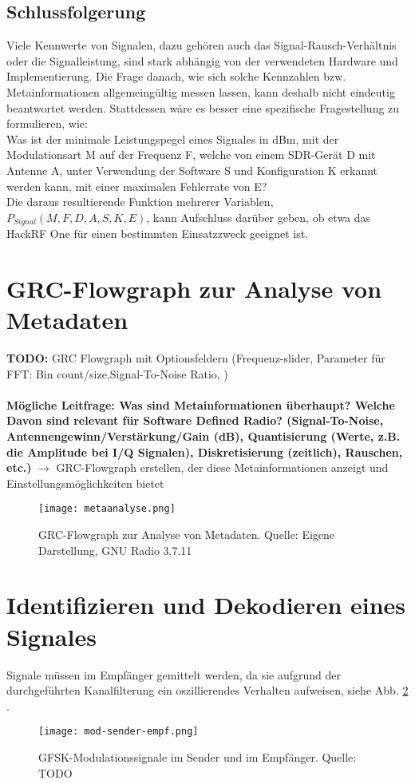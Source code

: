 \subsection{Schlussfolgerung}
Viele Kennwerte von Signalen, dazu gehören auch das Signal-Rausch-Verhältnis oder die Signalleistung, sind stark abhängig von der verwendeten Hardware und Implementierung.
Die Frage danach, wie sich solche Kennzahlen bzw. Metainformationen allgemeingültig messen lassen, kann deshalb nicht eindeutig beantwortet werden.
Stattdessen wäre es besser eine spezifische Fragestellung zu formulieren, wie: \\
Was ist der minimale Leistungspegel eines Signales in dBm, mit der Modulationsart M auf der Frequenz F, welche von einem SDR-Gerät D mit Antenne A, unter Verwendung der Software S und Konfiguration K erkannt werden kann, mit einer maximalen Fehlerrate von E?\\
Die daraus resultierende Funktion mehrerer Variablen, \(P_{Signal} (M, F, D, A, S, K, E)\), kann Aufschluss darüber geben, ob etwa das HackRF One für einen bestimmten Einsatzzweck geeignet ist.

\newpage
\section{GRC-Flowgraph zur Analyse von Metadaten}
\textbf{TODO: } GRC Flowgraph mit Optionsfeldern (Frequenz-slider, Parameter für FFT: Bin count/size,Signal-To-Noise Ratio, )\\
\\
\textbf{Mögliche Leitfrage: Was sind Metainformationen überhaupt? Welche Davon sind relevant für Software Defined Radio? (Signal-To-Noise, Antennengewinn/Verstärkung/Gain (dB), Quantisierung (Werte, z.B. die Amplitude bei I/Q Signalen), Diskretisierung (zeitlich), Rauschen, etc.)} $\rightarrow$ GRC-Flowgraph erstellen, der diese Metainformationen anzeigt und Einstellungsmöglichkeiten bietet

\begin{figure}[ht]
	\centering
	\texttt{[image: metaanalyse.png]}
	\caption[GRC-Flowgraph zur Analyse von Metadaten]{GRC-Flowgraph zur Analyse von Metadaten. Quelle: Eigene Darstellung, GNU Radio 3.7.11} 
	\label{metaanalyse}
\end{figure}



\section{Identifizieren und Dekodieren eines Signales}
Signale müssen im Empfänger gemittelt werden, da sie aufgrund der durchgeführten Kanalfilterung ein oszillierendes Verhalten aufweisen, siehe Abb. \ref{mod-send-empf} \cite[vgl. Heuberger, e. a., S. TODO]{Heuberger:2017}.

\begin{figure}[ht]
	\centering
	\texttt{[image: mod-sender-empf.png]}
	\caption[GFSK-Modulationssignale im Sender und im Empfänger]{GFSK-Modulationssignale im Sender und im Empfänger. Quelle: TODO} %
	\label{mod-send-empf}
\end{figure}


\newpage
